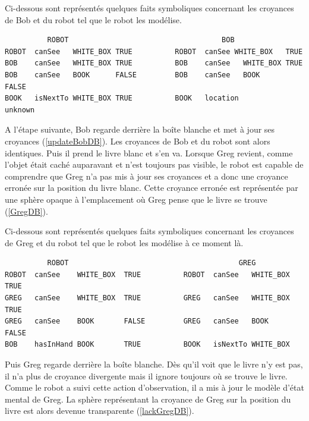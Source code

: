 \documentclass[a4paper,11pt,twoside]{StyleThese}
\begin{document}
Ci-dessous sont représentés quelques faits symboliques concernant les croyances de Bob et du robot tel que le robot les modélise.

\begin{scriptsize}
\begin{verbatim}
          ROBOT                                    BOB
ROBOT  canSee   WHITE_BOX TRUE          ROBOT  canSee WHITE_BOX   TRUE    
BOB    canSee   WHITE_BOX TRUE          BOB    canSee   WHITE_BOX TRUE
BOB    canSee   BOOK      FALSE         BOB    canSee   BOOK      FALSE
BOOK   isNextTo WHITE_BOX TRUE          BOOK   location           unknown
\end{verbatim}
\end{scriptsize}

A l'étape suivante, Bob regarde derrière la boîte blanche et met à jour ses croyances (\ref{updateBobDB}). Les croyances de Bob et du robot sont alors identiques.
Puis il prend le livre blanc et s'en va. Lorsque Greg revient, comme l'objet était caché auparavant et n'est toujours pas visible, le robot est capable de comprendre que Greg n'a pas mis à jour ses croyances et a donc une croyance erronée sur la position du livre blanc. Cette croyance erronée est représentée par une sphère opaque à l'emplacement où Greg pense que le livre se trouve (\ref{GregDB}).

Ci-dessous sont représentés quelques faits symboliques concernant les croyances de Greg et du robot tel que le robot les modélise à ce moment là.

\begin{scriptsize}
\begin{verbatim}
          ROBOT                                        GREG
ROBOT  canSee    WHITE_BOX  TRUE          ROBOT  canSee   WHITE_BOX   TRUE    
GREG   canSee    WHITE_BOX  TRUE          GREG   canSee   WHITE_BOX   TRUE
GREG   canSee    BOOK       FALSE         GREG   canSee   BOOK        FALSE
BOB    hasInHand BOOK       TRUE          BOOK   isNextTo WHITE_BOX
\end{verbatim}
\end{scriptsize}

Puis Greg regarde derrière la boîte blanche. Dès qu'il voit que le livre n'y est pas, il n'a plus de croyance divergente mais il ignore toujours où se trouve le livre. Comme le robot a suivi cette action d'observation, il a mis à jour le modèle d'état mental de Greg. La sphère représentant la croyance de Greg sur la position du livre est alors devenue transparente (\ref{lackGregDB}).
\end{document}
